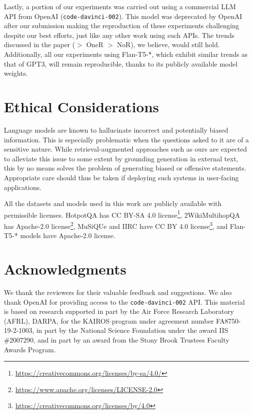 Lastly, a portion of our experiments was carried out using a commercial LLM API from OpenAI (\texttt{code-davinci-002}). This model was deprecated by OpenAI after our submission making the reproduction of these experiments challenging despite our best efforts, just like any other work using such APIs. The trends discussed in the paper (\iconsys $>$ OneR $>$ NoR), we believe, would still hold. Additionally, all our experiments using Flan-T5-*, which exhibit similar trends as that of GPT3, will remain reproducible, thanks to its publicly available model weights.
\section*{Ethical Considerations}

Language models are known to hallucinate incorrect and potentially biased information. This is especially problematic when the questions asked to it are of a sensitive nature. While retrieval-augmented approaches such as ours are expected to alleviate this issue to some extent by grounding generation in external text, this by no means solves the problem of generating biased or offensive statements. Appropriate care should thus be taken if deploying such systems in user-facing applications.

All the datasets and models used in this work are publicly available with permissible licenses. HotpotQA has CC BY-SA 4.0 license\footnote{\url{https://creativecommons.org/licenses/by-sa/4.0/}}, 2WikiMultihopQA has Apache-2.0 license\footnote{\url{https://www.apache.org/licenses/LICENSE-2.0}}, MuSiQUe and IIRC have CC BY 4.0 license\footnote{\url{https://creativecommons.org/licenses/by/4.0}}, and Flan-T5-* models have Apache-2.0 license.\section*{Acknowledgments}

We thank the reviewers for their valuable feedback and suggestions. We also thank OpenAI for providing access to the \texttt{code-davinci-002} API. This material is based on research supported in part by the Air Force Research Laboratory (AFRL), DARPA, for the KAIROS program under agreement number FA8750-19-2-1003, in part by the National Science Foundation under the award IIS \#2007290, and in part by an award from the Stony Brook Trustees Faculty Awards Program.

